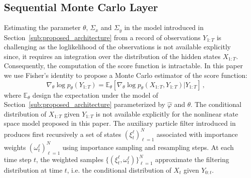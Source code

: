 \documentclass[journal]{IEEEtran}
\begin{document}
\subsection{Sequential Monte Carlo Layer}%
\label{sub:uncertainty_estimation}

Estimating the parameter $\theta$, $\Sigma_x$ and $\Sigma_y$ in the model introduced in Section~\ref{sub:proposed_architecture} from a record of observations $Y_{1:T}$ is challenging as the loglikelihood of the observations is not available explicitly since, it requires an integration over the distribution of the hidden states $X_{1:T}$. Consequently, the computation of the score function is intractable.
In this paper we use Fisher's identity to propose a Monte Carlo estimator of the score function:
\begin{equation}
	\nabla_\theta \log p_\theta(Y_{1:T}) = \mathbb{E}_\theta \left[ \nabla_\theta\log p_\theta(X_{1:T}, Y_{1:T}) | Y_{1:T} \right]\,,
	\label{eq:grad_ll}
\end{equation}
where $\mathbb{E}_\theta$ design the expectation under the model of Section~\ref{sub:proposed_architecture} parameterized by $\widehat \varphi$ and $\theta$. The conditional distribution of $X_{1:T}$ given $Y_{1:T}$ is not available explicitly for the nonlinear state space model proposed in this paper. %
The auxiliary particle filter introduced in \cite{Jun1998} produces first recursively a set of states $(\xi^{\ell}_t)_{\ell=1}^N$ associated with importance weights $(\omega^{\ell}_t)_{\ell=1}^N$ using importance sampling and resampling steps.
At each time step $t$, the weighted samples $\{(\xi^{\ell}_t,\omega^{\ell}_t)\}_{\ell=1}^N$ approximate the filtering distribution at time $t$, i.e. the conditional distribution of $X_t$ given $Y_{0:t}$.
\end{document}
